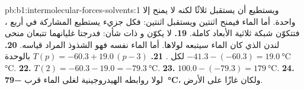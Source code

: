 \begin{solution}{pb:b1:intermolecular-forces-solvents:1}
ويستطيع  أن يستقبل ثلاثًا لكنه لا يمنح إلا واحدة. أما الماء فيمنح اثنتين ويستقبل
اثنتين: فكل جزيء يستطيع المشاركة في أربع ، فتتكوّن شبكة
ثلاثية الأبعاد كاملة.
\textbf{19.} لا يكوّن  و  ذات شأن:
فدرجتا غليانهما تتبعان منحى لندن الذي كان الماء سيتبعه
لولاها. أما الماء نفسه فهو الشذوذ المراد قياسه.
\textbf{20.} $-41.3 - (-60.3) = \qty{19.0}{\celsius}$ لكل .
\textbf{21.} $T(p) = -60.3 + 19.0\,(p - 3)$ بالوحدة \unit{\celsius}.
\textbf{22.} $T(2) = -60.3 - 19.0 = \qty{-79.3}{\celsius}$.
\textbf{23.} $100.0 - (-79.3) = \qty{179}{\celsius}$.
\textbf{24.} لولا روابطه الهيدروجينية لغلى الماء قرب
\textbf{\qty{-79}{\celsius}}، ولكان غازًا على الأرض.
\end{solution}
